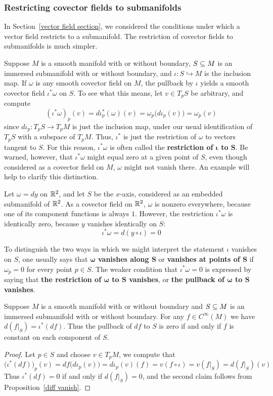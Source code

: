 \subsubsection{Restricting covector fields to submanifolds}
In Section~\ref{vector field section}, we considered the conditions under which a vector field restricts to a submanifold. The restriction of covector fields to submanifolds is much simpler.\par
Suppose $M$ is a smooth manifold with or without boundary, $S\subseteq M$ is an immersed submanifold with or without boundary, and $\iota:S\hookrightarrow M$ is the inclusion map. If $\omega$ is any smooth covector field on $M$, the pullback by $\iota$ yields a smooth covector field $\iota^*\omega$ on $S$. To see what this means, let $v\in T_pS$ be arbitrary, and compute
\[(\iota^*\omega)_p(v)=d\iota^*_p(\omega)(v)=\omega_p\big(d\iota_p(v)\big)=\omega_p(v)\]
since $d\iota_p:T_pS\to T_pM$ is just the inclusion map, under our usual identification of $T_pS$ with a subspace of $T_pM$. Thus, $\iota^*$ is just the restriction of $\omega$ to vectors tangent to $S$. For this reason, $\iota^*\omega$ is often called the \textbf{restriction of $\bm{\iota}$ to $\bm{S}$}. Be warned, however, that $\iota^*\omega$ might equal zero at a given point of $S$, even though considered as a covector field on $M$, $\omega$ might not vanish there. An example will help to clarify this distinction.
\begin{example}
Let $\omega=dy$ on $\mathbb{R}^2$, and let $S$ be the $x$-axis, considered as an embedded submanifold of $\mathbb{R}^2$. As a covector field on $\mathbb{R}^2$, $\omega$ is nonzero everywhere, because one of its component functions is always $1$. However, the restriction $\iota^*\omega$ is identically zero, because $y$ vanishes identically on $S$:
\[\iota^*\omega=d(y\circ\iota)=0\]
\end{example}
To distinguish the two ways in which we might interpret the statement $\iota$ vanishes on $S$, one usually says that \textbf{$\bm{\omega}$ vanishes along $\bm{S}$} or \textbf{vanishes at points of $\bm{S}$} if $\omega_p=0$ for every point $p\in S$. The weaker condition that $\iota^*\omega=0$ is expressed by saying that \textbf{the restriction of $\bm{\omega}$ to $\bm{S}$ vanishes}, or \textbf{the pullback of $\bm{\omega}$ to $\bm{S}$ vanishes}.
\begin{proposition}\label{diff restrict submani}
Suppose $M$ is a smooth manifold with or without boundary and $S\subseteq M$ is an immersed submanifold with or without boundary. For any $f\in C^\infty(M)$ we have $d(f|_S)=\iota^*(df)$. Thus the pullback of $df$ to $S$ is zero if and only if $f$ is constant on each component of $S$.
\end{proposition}
\begin{proof}
Let $p\in S$ and choose $v\in T_pM$, we compute that
\[\big(\iota^*(df)\big)_p(v)=df\big(d\iota_p(v)\big)=d\iota_p(v)(f)=v(f\circ\iota)=v(f|_S)=d(f|_S)(v)\]
Thus $\iota^*(df)=0$ if and only if $d(f|_S)=0$, and the second claim follows from Proposition~\ref{diff vanish}.
\end{proof}
